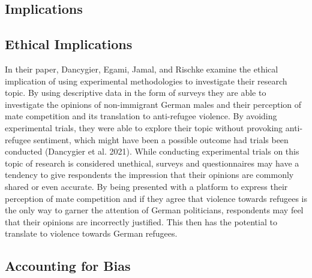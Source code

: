 \documentclass[
]{article}
\begin{document}
\hypertarget{implications}{%
\subsection{Implications}\label{implications}}

\hypertarget{ethical-implications}{%
\subsection{Ethical Implications}\label{ethical-implications}}

In their paper, Dancygier, Egami, Jamal, and Rischke examine the ethical
implication of using experimental methodologies to investigate their
research topic. By using descriptive data in the form of surveys they
are able to investigate the opinions of non-immigrant German males and
their perception of mate competition and its translation to anti-refugee
violence. By avoiding experimental trials, they were able to explore
their topic without provoking anti-refugee sentiment, which might have
been a possible outcome had trials been conducted (Dancygier et al.
2021). While conducting experimental trials on this topic of research is
considered unethical, surveys and questionnaires may have a tendency to
give respondents the impression that their opinions are commonly shared
or even accurate. By being presented with a platform to express their
perception of mate competition and if they agree that violence towards
refugees is the only way to garner the attention of German politicians,
respondents may feel that their opinions are incorrectly justified. This
then has the potential to translate to violence towards German refugees.

\hypertarget{accounting-for-bias}{%
\subsection{Accounting for Bias}\label{accounting-for-bias}}
\end{document}
